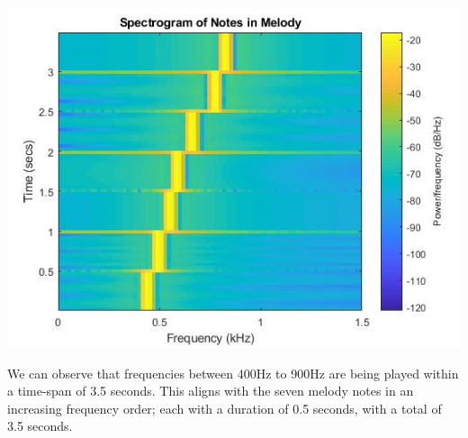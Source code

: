 \documentclass{article}
\begin{document}
        \begin{center}
            \includegraphics[width=\textwidth]{task2b.jpg}
        \end{center}
        We can observe that frequencies between 400Hz to 900Hz are being played within a time-span of 3.5 seconds. This aligns with the seven melody notes in an increasing frequency order; each with a duration of 0.5 seconds, with a total of 3.5 seconds.
        
\end{document}
